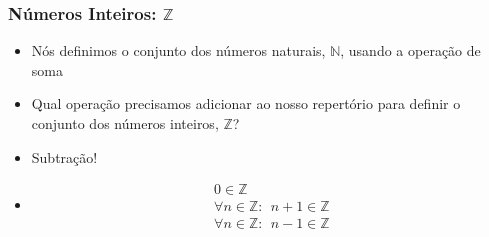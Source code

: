 \documentclass[usenames,dvipsnames,svgnames]{beamer}
\begin{document}
\begin{frame}	
	\frametitle{Números Inteiros: $\mathbb{Z}$}

	\begin{itemize}
		\item Nós definimos o conjunto dos números naturais, $\mathbb{N}$, usando a operação de soma
		\item Qual operação precisamos adicionar ao nosso repertório para definir o conjunto dos números inteiros, $\mathbb{Z}$?
		\item Subtração!
		\item
			\begin{equation}
			\begin{aligned}
				0 \in \mathbb{Z} \\
				\forall n \in \mathbb{Z}: ~~ n+1 \in \mathbb{Z} \\
				\forall n \in \mathbb{Z}: ~~ n-1 \in \mathbb{Z}
			\end{aligned}
			\end{equation}
 	\end{itemize}
\end{frame}
\end{document}
